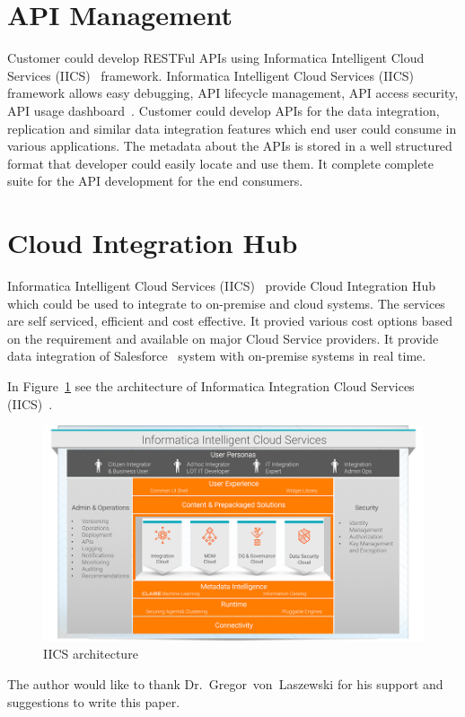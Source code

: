 \section{API Management}

Customer could develop RESTFul APIs using Informatica Intelligent Cloud Services (IICS)~\cite{hid-sp18-511-iics} framework. Informatica Intelligent Cloud Services (IICS)~\cite{hid-sp18-511-iics} framework allows easy debugging, API lifecycle management, API access security, API usage dashboard~\cite{hid-sp18-511-iics-pricing}. Customer could develop APIs for the data integration, replication and similar data integration features which end user could consume in various applications. The metadata about the APIs is stored in a well structured format that developer could easily locate and use them. It complete complete suite for the API development for the end consumers.

\section{Cloud Integration Hub}
Informatica Intelligent Cloud Services (IICS)~\cite{hid-sp18-511-iics} provide Cloud Integration Hub~\cite{hid-sp18-511-iics-hub} which could be used to integrate to on-premise and cloud systems. The services are self serviced, efficient and cost effective. It provied various cost options based on the requirement and available on major Cloud Service providers. It provide data integration of Salesforce~\cite{hid-sp18-511-salesforce} system with on-premise systems in real time.

In Figure~\ref{f:iics-products}\cite{hid-sp18-511-iics} see the
architecture of Informatica Integration Cloud Services
(IICS)~\cite{hid-sp18-511-iics}.

\begin{figure}[!ht]
	\centering\includegraphics[width=\columnwidth]{images/iics-diagram.png}
	\caption{IICS architecture}\label{f:iics-products}
\end{figure}

\begin{acks}

The author would like to thank Dr.~Gregor~von~Laszewski for his
support and suggestions to write this paper.

\end{acks}


 
